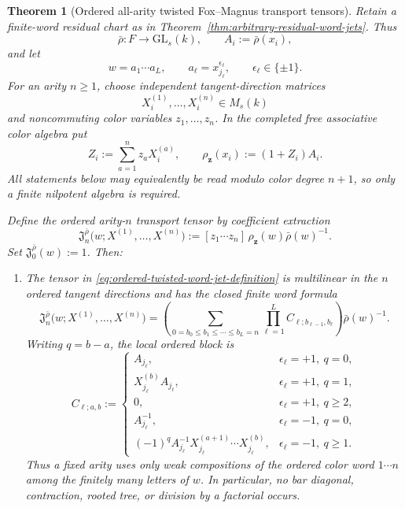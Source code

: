 \documentclass[11pt]{article}
\newtheorem{theorem}{Theorem}[section]
\theoremstyle{definition}
\begin{document}
\begin{theorem}[Ordered all-arity twisted Fox--Magnus transport tensors]\label{thm:ordered-twisted-fox-magnus}
Retain a finite-word residual chart as in
Theorem~\ref{thm:arbitrary-residual-word-jets}.  Thus
\[
 \bar\rho:F\longrightarrow \mathrm{GL}_s(k),
 \qquad
 A_i:=\bar\rho(x_i),
\]
and let
\[
 w=a_1\cdots a_L,
 \qquad
 a_\ell=x_{j_\ell}^{\epsilon_\ell},
 \qquad
 \epsilon_\ell\in\{\pm1\}.
\]
For an arity $n\ge1$, choose independent tangent-direction matrices
\[
 X_i^{(1)},\ldots,X_i^{(n)}\in M_s(k)
\]
and noncommuting color variables $z_1,\ldots,z_n$.  In the completed free
associative color algebra put
\[
 Z_i:=\sum_{a=1}^n z_aX_i^{(a)},
 \qquad
 \rho_{\mathbf z}(x_i):=(1+Z_i)A_i.
\]
All statements below may equivalently be read modulo color degree $n+1$, so
only a finite nilpotent algebra is required.

Define the ordered arity-$n$ transport tensor by coefficient extraction
\begin{equation}\label{eq:ordered-twisted-word-jet-definition}
 \mathfrak J_n^{\bar\rho}
 \bigl(w;X^{(1)},\ldots,X^{(n)}\bigr)
 :=[z_1\cdots z_n]\,
 \rho_{\mathbf z}(w)\bar\rho(w)^{-1}.
\end{equation}
Set $\mathfrak J_0^{\bar\rho}(w):=1$.  Then:
\begin{enumerate}[label=\textnormal{(\roman*)}]
\item The tensor in
\eqref{eq:ordered-twisted-word-jet-definition} is multilinear in the $n$
ordered tangent directions and has the closed finite word formula
\begin{equation}\label{eq:ordered-twisted-word-jet}
 \boxed{
 \mathfrak J_n^{\bar\rho}
 \bigl(w;X^{(1)},\ldots,X^{(n)}\bigr)
 =
 \left(
 \sum_{0=b_0\le b_1\le\cdots\le b_L=n}
 \prod_{\ell=1}^L
 C_{\ell; b_{\ell-1},b_\ell}
 \right)\bar\rho(w)^{-1}.
 }
\end{equation}
Writing $q=b-a$, the local ordered block is
\begin{equation}\label{eq:ordered-letter-block}
 C_{\ell;a,b}:=
 \begin{cases}
 A_{j_\ell},
   &\epsilon_\ell=+1,\ q=0,\\
 X_{j_\ell}^{(b)}A_{j_\ell},
   &\epsilon_\ell=+1,\ q=1,\\
 0,
   &\epsilon_\ell=+1,\ q\ge2,\\
 A_{j_\ell}^{-1},
   &\epsilon_\ell=-1,\ q=0,\\
 (-1)^qA_{j_\ell}^{-1}
 X_{j_\ell}^{(a+1)}\cdots X_{j_\ell}^{(b)},
   &\epsilon_\ell=-1,\ q\ge1.
 \end{cases}
\end{equation}
Thus a fixed arity uses only weak compositions of the ordered color word
$1\cdots n$ among the finitely many letters of $w$.  In particular, no bar
diagonal, contraction, rooted tree, or division by a factorial occurs.


\end{enumerate}
\end{theorem}
\end{document}
